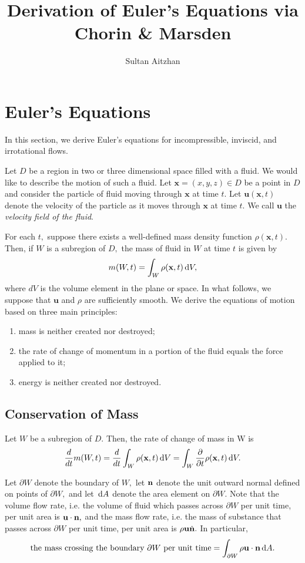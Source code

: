 \documentclass[10pt,a4paper,final]{article}
\title{Derivation of Euler's Equations via Chorin \& Marsden}
\author{Sultan Aitzhan}
\begin{document}
\maketitle
\thispagestyle{fancy}

\section{Euler's Equations}
In this section, we derive Euler's equations for incompressible, inviscid, and irrotational flows. 

Let $D$ be a region in two or three dimensional space filled with a fluid. We would like to describe the motion of such a fluid. Let $\textbf{x} = (x,y,z) \in D$ be a point in $D$ and consider the particle of fluid moving through $\textbf{x}$ at time $t.$ Let $\textbf{u}(\textbf{x},t)$ denote the velocity of the particle as it moves through $\textbf{x}$ at time $t.$ We call $\textbf{u}$ the \emph{velocity field of the fluid}. 

For each $t,$ suppose there exists a well-defined mass density function $\rho(\textbf{x}, t).$ Then, if $W$ is a subregion of $D,$ the mass of fluid in $W$ at time $t$ is given by 
\[ 
m(W,t) = \int_W \rho(\textbf{x}, t) \,\mathrm{d} V,
\]
where $dV$ is the volume element in the plane or space. In what follows, we suppose that $\textbf{u}$ and $\rho$ are sufficiently smooth. We derive the equations of motion based on three main principles:
\begin{enumerate}
\item mass is neither created nor destroyed;
\item the rate of change of momentum in a portion of the fluid equals the force applied to it;
\item energy is neither created nor destroyed.
\end{enumerate}

\subsection{Conservation of Mass}

Let $W$ be a subregion of $D.$ Then, the rate of change of mass in W is 
\begin{equation}\label{CoM:eq1}
\frac{d}{dt} m(W,t) = \frac{d}{dt} \int_W \rho(\textbf{x}, t) \,\mathrm{d} V =  \int_W \frac{\partial}{\partial t} \rho(\textbf{x}, t) \,\mathrm{d} V. 
\end{equation}

Let $\partial W$ denote the boundary of $W,$ let ${\bf n}$ denote the unit outward normal defined on points of $\partial W,$ and let $\,\mathrm{d} A$ denote the area element on $\partial W.$ Note that the volume flow rate, i.e. the volume of fluid which passes across $\partial W$ per unit time, per unit area is ${\bf u} \cdot {\bf n},$ and the mass flow rate, i.e. the mass of substance that passes across $\partial W$ per unit time, per unit area is $\rho {\bf u}\dot {\bf n}.$ In particular,  
\begin{equation}\label{CoM:eq2}
\mbox{the mass crossing the boundary $\partial W$ per unit time} = \int_{\partial W} \rho {\bf u} \cdot {\bf n} \,\mathrm{d} A.
\end{equation}
\end{document}
